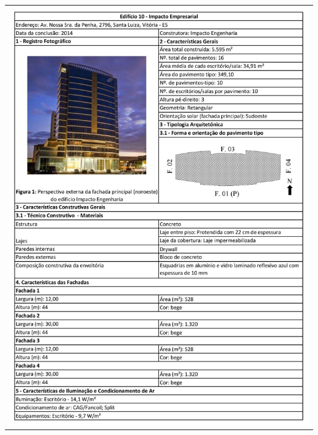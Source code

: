 \begin{table}[H]
    \centering
    \begin{tabular}{l}
        \includegraphics[width=\textwidth]{figures/appendices/edificio10.jpg}
    \end{tabular}
\end{table}
